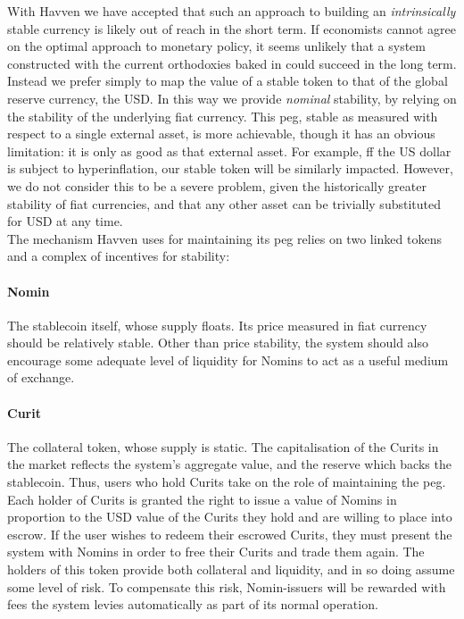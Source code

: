 \noindent With Havven we have accepted that such an approach to building an \textit{intrinsically} stable
currency is likely out of reach in the short term.
If economists cannot agree on the optimal approach to monetary policy, it seems unlikely that a system
constructed with the current orthodoxies baked in could succeed in the long term.
Instead we prefer simply to map the value of a stable token to that of the global reserve currency, the USD.
In this way we provide \textit{nominal} stability, by relying on the stability of the underlying
fiat currency.
This peg, stable as measured with respect to a single external asset, is more achievable, though it has
an obvious limitation: it is only as good as that external asset.
For example, ff the US dollar is subject to hyperinflation, our stable token will be similarly impacted.
However, we do not consider this to be a severe problem, given the historically greater stability of
fiat currencies, and that any other asset can be trivially substituted for USD at any time. \\

\noindent 
\noindent The mechanism Havven uses for maintaining its peg relies on two linked tokens and a
complex of incentives for stability:

\paragraph{Nomin} The stablecoin itself, whose supply floats. Its price measured in fiat currency should be relatively stable.
Other than price stability, the system should also encourage some adequate level of liquidity for Nomins
to act as a useful medium of exchange.

\paragraph{Curit} The collateral token, whose supply is static.
The capitalisation of the Curits in the market reflects the system's aggregate value, and the reserve
which backs the stablecoin. Thus, users who hold Curits take on the role of maintaining the peg. \\

\noindent Each holder of Curits is granted the right to issue a value of Nomins in proportion to the USD value
of the Curits they hold and are willing to place into escrow. If the user wishes to redeem their escrowed Curits, they must
present the system with Nomins in order to free their Curits and trade them again.
The holders of this token provide both collateral and liquidity, and in so doing assume some
level of risk. To compensate this risk, Nomin-issuers will be rewarded with fees the system levies
automatically as part of its normal operation.


